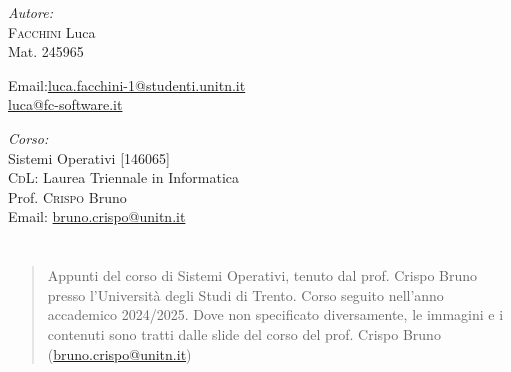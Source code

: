 \documentclass[a4paper,twoside]{book}
\makeatletter
\newenvironment{abstract}{
    \if@twocolumn
        \section*{\abstractname}%
    \else
        \begin{center}%
            {\bfseries \abstractname\vspace{-.5em}\vspace{\z@}}%
        \end{center}%
        \small
        \begin{quotation}
    \fi}
    {\if@twocolumn\else\end{quotation}\fi}
\makeatother
\begin{document}
\begin{titlepage}
        \vfill
        \begin{minipage}[t]{0.4\textwidth}
            \begin{flushleft} \normalsize
                \emph{Autore:}\\
                \textsc{Facchini} Luca \\ %
                Mat. 245965 \\
                \vspace{-\baselineskip}
                \begin{tabbing}
                    Email:\= \href{mailto:luca.facchini-1@studenti.unitn.it}{luca.facchini-1@studenti.unitn.it} \\
                        \>  \href{mailto:luca@fc-software.it}{luca@fc-software.it}
                \end{tabbing}
            \end{flushleft}
        \end{minipage}%
        \hfill
        \begin{minipage}[t]{0.4\textwidth}
            \begin{flushleft} \normalsize
                \emph{Corso:}\\
                Sistemi Operativi [146065] \\
                \textsc{CdL}: Laurea Triennale in Informatica \\
                Prof. \textsc{Crispo} Bruno \\
                Email: \href{mailto:bruno.crispo@unitn.it}{bruno.crispo@unitn.it}
            \end{flushleft}
        \end{minipage}
        \vfill
        \begin{abstract}
            Appunti del corso di Sistemi Operativi, tenuto dal prof. Crispo Bruno presso l'Università degli Studi di Trento. Corso seguito nell'anno accademico 2024/2025.\newline
            Dove non specificato diversamente, le immagini e i contenuti sono tratti dalle slide del corso del prof. Crispo Bruno (\href{mailto:bruno.crispo@unitn.it}{bruno.crispo@unitn.it})
        \end{abstract}
        
    \end{titlepage}
    \begingroup
        \pagestyle{tocStyle}
        \tableofcontents
    \endgroup
    \thispagestyle{tocStyle}
    \pagestyle{stdPage}
    \newpage
    \mainmatter
    
\end{document}
